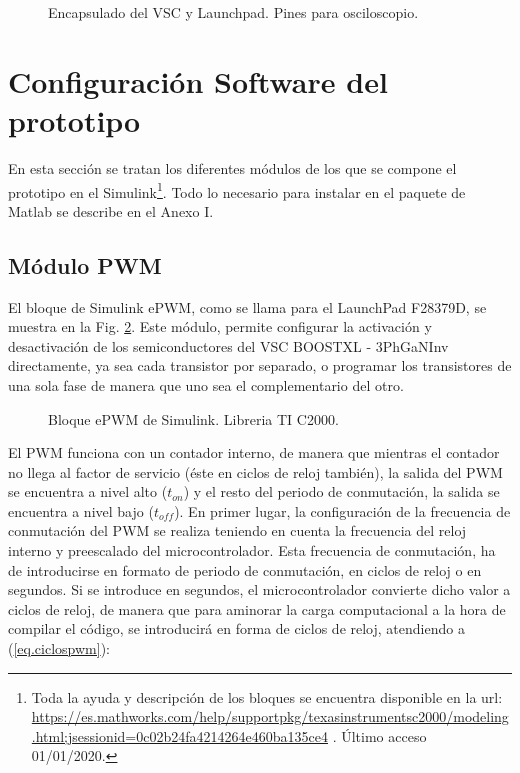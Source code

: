 \documentclass{report}
\begin{document}
\begin{figure}[!h]
    \begin{center}
        \end{center}
        \caption{Encapsulado del VSC y Launchpad. Pines para osciloscopio.}
        \label{fig.foto_pines}
\end{figure}

\clearpage

\section{Configuración Software del prototipo} \label{sec.discusiondelosresultados}
En esta sección se tratan los diferentes módulos de los que se compone el prototipo en el Simulink\footnote{Toda la ayuda y descripción de los bloques se encuentra disponible en la url: \url{https://es.mathworks.com/help/supportpkg/texasinstrumentsc2000/modeling.html;jsessionid=0c02b24fa4214264e460ba135ce4} . Último acceso 01/01/2020. }. Todo lo necesario para instalar en el paquete de Matlab se describe en el Anexo I.

\subsection{Módulo PWM} \label{sec.modulopwm}
El bloque de Simulink ePWM, como se llama para el LaunchPad F28379D, se muestra en la Fig. \ref{fig.moduloepwm}. Este módulo, permite configurar la activación y desactivación de los semiconductores del VSC BOOSTXL - 3PhGaNInv directamente, ya sea cada transistor por separado, o programar los transistores de una sola fase de manera que uno sea el complementario del otro. 


\begin{figure}[!h]
    \begin{center}
    \caption{Bloque ePWM de Simulink. Libreria TI C2000.}
    \label{fig.moduloepwm} 
    \end{center}
\end{figure}
El PWM funciona con un contador interno, de manera que mientras el contador no llega al factor de servicio (éste en ciclos de reloj también), la salida del PWM se encuentra a nivel alto ($t_{on}$) y el resto del periodo de conmutación, la salida se encuentra a nivel bajo ($t_{off}$). 
En primer lugar, la configuración de la frecuencia de conmutación del PWM se realiza teniendo en cuenta la frecuencia del reloj interno y preescalado del microcontrolador. Esta frecuencia de conmutación, ha de introducirse en formato de periodo de conmutación, en ciclos de reloj o en segundos. Si se introduce en segundos, el microcontrolador convierte dicho valor a ciclos de reloj, de manera que para aminorar la carga computacional a la hora de compilar el código, se introducirá en forma de ciclos de reloj, atendiendo a  (\ref{eq.ciclospwm}):
\end{document}
